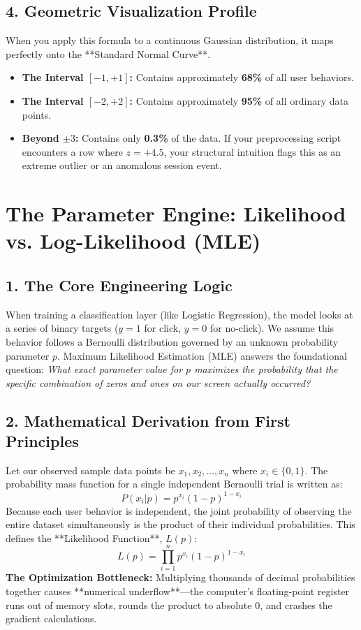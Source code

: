 \documentclass[12pt,a4paper]{article}
\begin{document}
\subsection*{4. Geometric Visualization Profile}
When you apply this formula to a continuous Gaussian distribution, it maps perfectly onto the **Standard Normal Curve**. 
\begin{itemize}
    \item \textbf{The Interval $[-1, +1]$:} Contains approximately \textbf{68\%} of all user behaviors.
    \item \textbf{The Interval $[-2, +2]$:} Contains approximately \textbf{95\%} of all ordinary data points.
    \item \textbf{Beyond $\pm 3$:} Contains only \textbf{0.3\%} of the data. If your preprocessing script encounters a row where $z = +4.5$, your structural intuition flags this as an extreme outlier or an anomalous session event.
\end{itemize}

\newpage
\section{The Parameter Engine: Likelihood vs. Log-Likelihood (MLE)}
\subsection*{1. The Core Engineering Logic}
When training a classification layer (like Logistic Regression), the model looks at a series of binary targets ($y = 1$ for click, $y = 0$ for no-click). We assume this behavior follows a Bernoulli distribution governed by an unknown probability parameter $p$. Maximum Likelihood Estimation (MLE) answers the foundational question: \textit{What exact parameter value for $p$ maximizes the probability that the specific combination of zeros and ones on our screen actually occurred?}

\subsection*{2. Mathematical Derivation from First Principles}
Let our observed sample data points be $x_1, x_2, \dots, x_n$ where $x_i \in \{0, 1\}$. The probability mass function for a single independent Bernoulli trial is written as:
$$P(x_i | p) = p^{x_i}(1-p)^{1-x_i}$$
Because each user behavior is independent, the joint probability of observing the entire dataset simultaneously is the product of their individual probabilities. This defines the **Likelihood Function**, $L(p)$:
$$L(p) = \prod_{i=1}^n p^{x_i}(1-p)^{1-x_i}$$
\textbf{The Optimization Bottleneck:} Multiplying thousands of decimal probabilities together causes **numerical underflow**—the computer's floating-point register runs out of memory slots, rounds the product to absolute $0$, and crashes the gradient calculations. 
\end{document}
